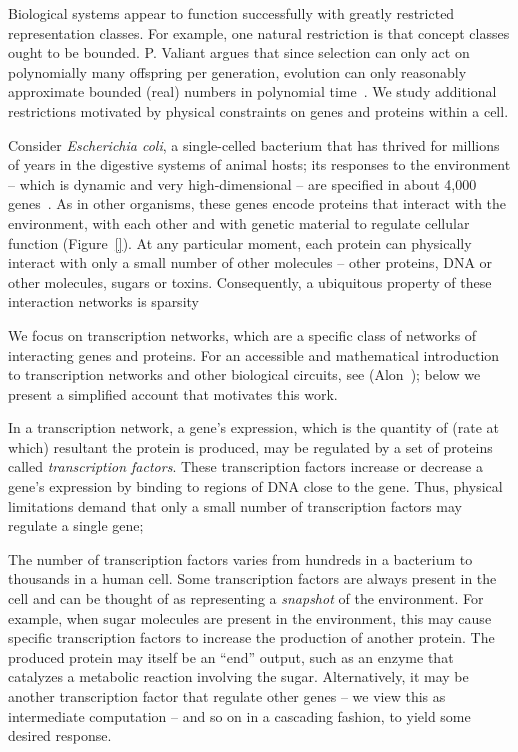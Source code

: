 Biological systems appear to function successfully with greatly restricted
representation classes. For example, one natural restriction is that concept
classes ought to be bounded.
P. Valiant argues that since selection can only act on polynomially many
offspring per generation, evolution can only reasonably approximate bounded
(real) numbers in polynomial time~\cite{Valiant:2012-real}.
We study additional restrictions motivated by physical constraints on
genes and proteins within a cell.

Consider \emph{Escherichia coli}, a single-celled
bacterium that has thrived for millions of years in the digestive systems of
animal hosts; its responses to the environment -- which is dynamic and very
high-dimensional -- are specified in about 4,000 genes~\cite{biology}.
As in other organisms, these genes encode proteins that interact with the
environment, with each other and with genetic material to regulate cellular
function (Figure~\ref{}).
At any particular moment, each protein can physically interact with only
a small number of other molecules -- other proteins, DNA or other molecules,
\eg sugars or toxins.
Consequently, a ubiquitous property of these interaction networks is sparsity

We focus on transcription networks, which are a specific class of networks of
interacting genes and proteins. For an accessible and mathematical introduction to
transcription networks and other biological circuits, see (Alon~\cite{alon});
below we present a simplified account that motivates this work.


In a transcription network, a gene's expression, which is the
quantity of (rate at which) resultant the protein is produced, may be
regulated by a set of proteins called \emph{transcription factors}.
These transcription factors increase or decrease a gene's expression by binding
to regions of DNA close to the gene. 
Thus, physical limitations demand that only a small number of transcription
factors may regulate a single gene; 

The number of transcription factors varies from hundreds in a bacterium to
thousands in a human cell.
Some transcription factors are always present in the cell and can be thought of
as representing a \emph{snapshot} of the environment.
For example, when sugar molecules are present in the environment, this may cause
specific transcription factors to increase the production of another protein.
The produced protein may itself be an ``end'' output, such as an enzyme that
catalyzes a metabolic reaction involving the sugar.
Alternatively, it may be another transcription factor that regulate other genes
-- we view this as intermediate computation -- and so on in a cascading
fashion, to yield some desired response.

